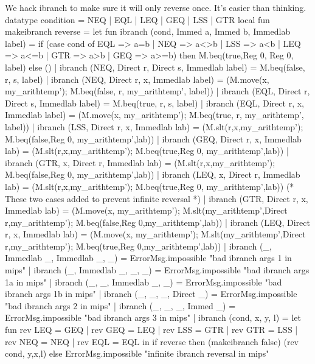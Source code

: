 \endcode
{}
We hack \code{}ibranch\edoc{} to make sure it will only reverse once.
It's easier than thinking.
\enddocs
{}
\endmoddef
datatype condition = NEQ | EQL | LEQ | GEQ | LSS | GTR
local 
fun makeibranch reverse = 
let
fun ibranch (cond, Immed a, Immed b, Immedlab label) =
            if (case cond of EQL => a=b | NEQ => a<>b | LSS => a<b |
                             LEQ => a<=b | GTR => a>b | GEQ => a>=b)
                then M.beq(true,Reg 0, Reg 0, label) else ()
  | ibranch (NEQ, Direct r, Direct s, Immedlab label) =
                    M.beq(false, r, s, label)
  | ibranch (NEQ, Direct r, x, Immedlab label) =
                    (M.move(x, my_arithtemp');
                     M.beq(false, r, my_arithtemp', label))
  | ibranch (EQL, Direct r, Direct s, Immedlab label) =
                    M.beq(true, r, s, label)
  | ibranch (EQL, Direct r, x, Immedlab label) =
                    (M.move(x, my_arithtemp');
                     M.beq(true, r, my_arithtemp', label))
  | ibranch (LSS, Direct r, x, Immedlab lab) =
                (M.slt(r,x,my_arithtemp');
                 M.beq(false,Reg 0, my_arithtemp',lab))
  | ibranch (GEQ, Direct r, x, Immedlab lab) =
                (M.slt(r,x,my_arithtemp'); 
                 M.beq(true,Reg 0, my_arithtemp',lab))
  | ibranch (GTR, x, Direct r, Immedlab lab) =
                (M.slt(r,x,my_arithtemp'); 
                 M.beq(false,Reg 0, my_arithtemp',lab))
  | ibranch (LEQ, x, Direct r, Immedlab lab) =
                (M.slt(r,x,my_arithtemp'); 
                 M.beq(true,Reg 0, my_arithtemp',lab))
(* These two cases added to prevent infinite reversal *)
  | ibranch (GTR, Direct r, x, Immedlab lab) =
                (M.move(x, my_arithtemp');
                 M.slt(my_arithtemp',Direct r,my_arithtemp');
                 M.beq(false,Reg 0,my_arithtemp',lab))
  | ibranch (LEQ, Direct r, x, Immedlab lab) =
                (M.move(x, my_arithtemp');
                 M.slt(my_arithtemp',Direct r,my_arithtemp');
                 M.beq(true,Reg 0,my_arithtemp',lab))
  | ibranch (_, Immedlab _, Immedlab _, _) = 
                ErrorMsg.impossible "bad ibranch args 1 in mips"
  | ibranch (_, Immedlab _, _, _) = 
                ErrorMsg.impossible "bad ibranch args 1a in mips"
  | ibranch (_, _, Immedlab _, _) = 
                ErrorMsg.impossible "bad ibranch args 1b in mips"
  | ibranch (_, _, _, Direct _) = 
                ErrorMsg.impossible "bad ibranch args 2 in mips"
  | ibranch (_, _, _, Immed _) = 
                ErrorMsg.impossible "bad ibranch args 3 in mips"
  | ibranch (cond, x, y, l) = 
        let fun rev LEQ = GEQ
              | rev GEQ = LEQ
              | rev LSS = GTR
              | rev GTR = LSS
              | rev NEQ = NEQ
              | rev EQL = EQL
        in  if reverse then (makeibranch false) (rev cond, y,x,l) 
            else ErrorMsg.impossible "infinite ibranch reversal in mips"
        
